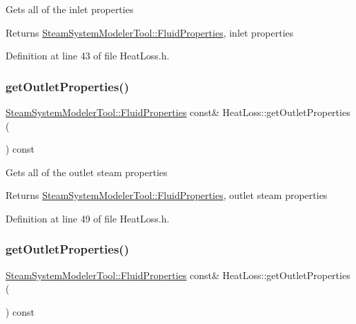 Gets all of the inlet properties \begin{DoxyReturn}{Returns}
\hyperlink{struct_steam_system_modeler_tool_1_1_fluid_properties}{Steam\+System\+Modeler\+Tool\+::\+Fluid\+Properties}, inlet properties 
\end{DoxyReturn}


Definition at line 43 of file Heat\+Loss.\+h.

\mbox{\label{class_heat_loss_a3e483dda6f393d67d7a0f28bcd75e545}} 
\subsubsection{\texorpdfstring{get\+Outlet\+Properties()}{getOutletProperties()}\hspace{0.1cm}{\footnotesize\ttfamily [1/3]}}
{\footnotesize\ttfamily \hyperlink{struct_steam_system_modeler_tool_1_1_fluid_properties}{Steam\+System\+Modeler\+Tool\+::\+Fluid\+Properties} const\& Heat\+Loss\+::get\+Outlet\+Properties (\begin{DoxyParamCaption}{ }\end{DoxyParamCaption}) const\hspace{0.3cm}{\ttfamily [inline]}}

Gets all of the outlet steam properties \begin{DoxyReturn}{Returns}
\hyperlink{struct_steam_system_modeler_tool_1_1_fluid_properties}{Steam\+System\+Modeler\+Tool\+::\+Fluid\+Properties}, outlet steam properties 
\end{DoxyReturn}


Definition at line 49 of file Heat\+Loss.\+h.

\mbox{\label{class_heat_loss_a3e483dda6f393d67d7a0f28bcd75e545}} 
\subsubsection{\texorpdfstring{get\+Outlet\+Properties()}{getOutletProperties()}\hspace{0.1cm}{\footnotesize\ttfamily [2/3]}}
{\footnotesize\ttfamily \hyperlink{struct_steam_system_modeler_tool_1_1_fluid_properties}{Steam\+System\+Modeler\+Tool\+::\+Fluid\+Properties} const\& Heat\+Loss\+::get\+Outlet\+Properties (\begin{DoxyParamCaption}{ }\end{DoxyParamCaption}) const\hspace{0.3cm}{\ttfamily [inline]}}

